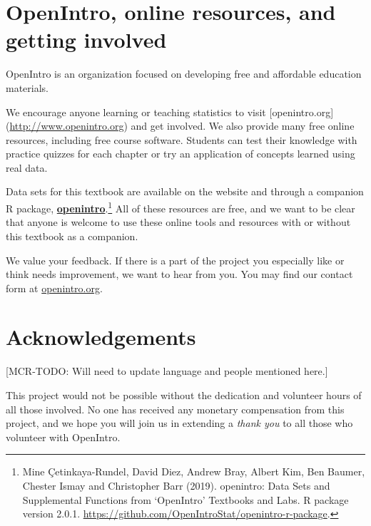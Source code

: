 \documentclass[]{book}
\begin{document}
\hypertarget{openintro-online-resources-and-getting-involved}{%
\section*{OpenIntro, online resources, and getting involved}\label{openintro-online-resources-and-getting-involved}}

OpenIntro is an organization focused on developing free and affordable education materials.

We encourage anyone learning or teaching statistics to visit {[}openintro.org{]} (\url{http://www.openintro.org}) and get involved. We also provide many free online resources, including free course software. Students can test their knowledge with practice quizzes for each chapter or try an application of concepts learned using real data.

Data sets for this textbook are available on the website and through a companion R package, \href{http://openintrostat.github.io/openintro-r-package/}{\textbf{openintro}}.\footnote{Mine Çetinkaya-Rundel, David Diez, Andrew Bray, Albert Kim, Ben Baumer, Chester Ismay and Christopher Barr (2019). openintro: Data Sets and Supplemental Functions from `OpenIntro' Textbooks and Labs. R package version 2.0.1. \url{https://github.com/OpenIntroStat/openintro-r-package}.} All of these resources are free, and we want to be clear that anyone is welcome to use these online tools and resources with or without this textbook as a companion.

We value your feedback. If there is a part of the project you especially like or think needs improvement, we want to hear from you. You may find our contact form at \href{https://www.openintro.org/form/?f=contact}{openintro.org}.

\hypertarget{acknowledgements}{%
\section*{Acknowledgements}\label{acknowledgements}}

{[}MCR-TODO: Will need to update language and people mentioned here.{]}

This project would not be possible without the dedication and volunteer hours of all those involved. No one has received any monetary compensation from this project, and we hope you will join us in extending a \emph{thank you} to all those who volunteer with OpenIntro.
\end{document}
